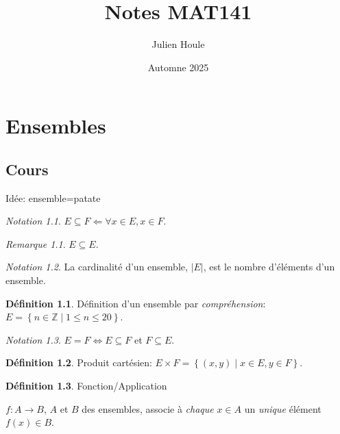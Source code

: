 \documentclass{report}
\title{Notes MAT141}
\author{Julien Houle}
\date{Automne 2025}
\newcounter{cours}
\newcommand*{\cours}{\section*{Cours \thecours}\stepcounter{cours}}
\newcommand*{\card}[1]{\left| #1 \right|}
\theoremstyle{definition}
\newtheorem*{defin}{D\'efinition}
\theoremstyle{remark}
\newtheorem*{nota}{Notation}
\newtheorem*{rema}{Remarque}
\begin{document}
	\maketitle
	\tableofcontents
	\newpage

	\chapter{Ensembles}
	\cours
	Id\'ee: ensemble=patate


	\begin{nota}
		$E \subseteq F \Leftarrow \forall x \in E, x \in F$.
		\begin{rema}
			$E \subseteq E$.
		\end{rema}
	\end{nota}

	\begin{nota}
		La cardinalit\'e d'un ensemble, $\card{E}$, est le nombre d'\'el\'ements d'un ensemble.
	\end{nota}

	\begin{defin}
		D\'efinition d'un ensemble par \emph{compr\'ehension}: $E=\left\lbrace n \in \mathbb{Z} \middle| 1 \leq n \leq 20 \right\rbrace$.
	\end{defin}

	\begin{nota}
		$E=F \Leftrightarrow E \subseteq F$ et $F \subseteq E$.
	\end{nota}

	\begin{defin}
		Produit cart\'esien: $E \times F=\left\lbrace (x,y) \middle| x \in E, y \in F \right\rbrace$.
	\end{defin}

	\begin{defin}
		Fonction/Application

		$f: A \to B$, $A$ et $B$ des ensembles, associe \`a \emph{chaque} $x \in A$ un \emph{unique} \'el\'ement $f(x) \in B$.
	\end{defin}
\end{document}
